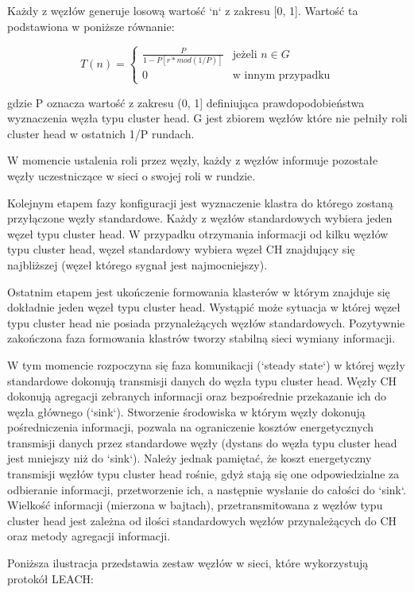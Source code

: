 \documentclass[a4paper,12pt,twoside,openany]{report}
\begin{document}
Każdy z węzłów generuje losową wartość `n` z zakresu [0, 1]. Wartość ta podstawiona w poniższe równanie:

\[
T(n) = \begin{cases}
\frac{P}{1 - P[r * mod(1/P)]} & \text{jeżeli } n \in G\\
0 & \text{w innym przypadku}
\end{cases}
\]

gdzie P oznacza wartość z zakresu (0, 1] definiująca prawdopodobieństwa wyznaczenia węzła typu cluster head.
G jest zbiorem węzłów które nie pełniły roli cluster head w ostatnich 1/P rundach.

W momencie ustalenia roli przez węzły, każdy z węzłów informuje pozostałe węzły uczestniczące w sieci o swojej roli w rundzie.

Kolejnym etapem fazy konfiguracji jest wyznaczenie klastra do którego zostaną przyłączone węzły standardowe.
Każdy z węzłów standardowych wybiera jeden węzeł typu cluster head. W przypadku otrzymania informacji od kilku węzłów typu cluster head,
węzeł standardowy wybiera węzeł CH znajdujący się najbliższej (węzeł którego sygnał jest najmocniejszy).

Ostatnim etapem jest ukończenie formowania klasterów w którym znajduje się dokładnie jeden węzeł typu cluster head.
Wystąpić może sytuacja w której węzeł typu cluster head nie posiada przynależących węzłów standardowych.
Pozytywnie zakończona faza formowania klastrów tworzy stabilną sieci wymiany informacji.

W tym momencie rozpoczyna się faza komunikacji (`steady state`) w której węzły standardowe dokonują transmisji danych do  węzła typu cluster head.
Węzły CH dokonują agregacji zebranych informacji oraz bezpośrednie przekazanie ich do węzła głównego (`sink`).
Stworzenie środowiska w którym węzły dokonują pośredniczenia informacji, pozwala na ograniczenie kosztów energetycznych transmisji danych przez
standardowe węzły (dystans do węzła typu cluster head jest mniejszy niż do `sink`). Należy jednak pamiętać, że koszt energetyczny transmisji węzłów typu cluster head rośnie, gdyż
stają się one odpowiedzialne za odbieranie informacji, przetworzenie ich, a następnie wysłanie do całości do `sink`. Wielkość informacji (mierzona w bajtach), przetransmitowana 
z węzłów typu cluster head jest zależna od ilości standardowych węzłów przynależących do CH oraz metody agregacji informacji.

Poniższa ilustracja przedstawia zestaw węzłów w sieci, które wykorzystują protokół LEACH:
\end{document}
